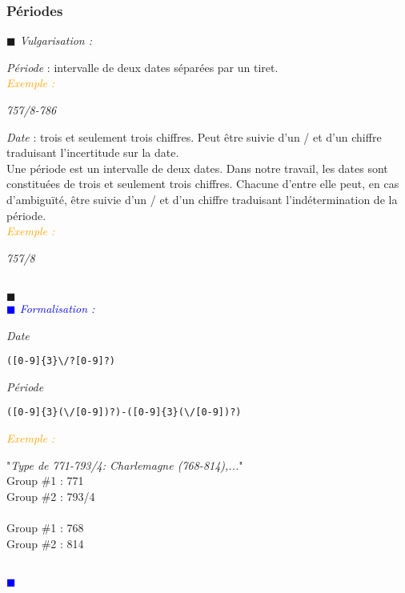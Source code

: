 \documentclass[a4paper, 11pt]{book}
\newenvironment{vulgarisation}
    {
    \textit{\textcolor{dark-blue}{$\blacksquare$  Vulgarisation : \\}}

    }
    {
    ~\\\textcolor{dark-blue}{$\blacksquare$}\\
    }
\newenvironment{formalisation}
    {
    \textit{\textcolor{blue}{$\blacksquare$  Formalisation : \\}}
    }
    {
    ~\\\textcolor{blue}{$\blacksquare$}\\
    }
\newenvironment{exemple}
    {
    \textit{\textcolor{orange}{
    Exemple : \\}}
    }
    {\\
    }
\begin{document}
\subsubsection{Périodes}
\begin{vulgarisation}
	\textit{Période} : intervalle de deux dates séparées par un tiret.\\
	\begin{exemple}
		\textit{757/8-786}
	\end{exemple}
	
	\textit{Date} : trois et seulement trois chiffres. Peut être suivie d'un \og/\fg{} et d'un chiffre traduisant l'incertitude sur la date.\\
	Une période est un intervalle de deux dates. Dans notre travail, les dates sont constituées de trois et seulement trois chiffres. Chacune d'entre elle peut, en cas d’ambiguïté, être suivie d'un \og/\fg{} et d'un chiffre traduisant l'indétermination de la période.\\
	\begin{exemple}
		\textit{757/8}
	\end{exemple}
	
\end{vulgarisation}
\begin{formalisation}
	\textit{Date}
	\begin{verbatim}
([0-9]{3}\/?[0-9]?)
	\end{verbatim}
	\textit{Période}
	\begin{verbatim}
([0-9]{3}(\/[0-9])?)-([0-9]{3}(\/[0-9])?)
	\end{verbatim}
	\begin{exemple}
		"\emph{Type de 771-793/4: Charlemagne (768-814),...}" \\
		Group \#1 : 771 \\
		Group \#2 : 793/4\\\\\noindent
		Group \#1 : 768 \\
		Group \#2 : 814
	\end{exemple}
\end{formalisation}
\end{document}
